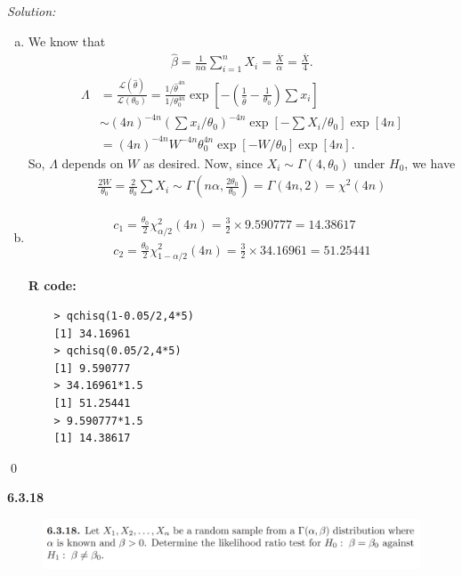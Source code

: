 \documentclass{book}
\theoremstyle{definition}
\newcommand{\lag}{\mathcal{L}}
\newcommand{\nn}{\nonumber}
\newcommand{\al}{\alpha}
\newcommand{\f}[2]{\frac{#1}{#2}}
\newcommand{\lp}{\left(}
\newcommand{\rp}{\right)}
\newcommand{\lb}{\left[}
\newcommand{\rb}{\right]}
\begin{document}
\noindent \textit{Solution:} 
\begin{enumerate}[(a)]
	\item 
	We know that
	\begin{align}
	\hat\beta = \f{1}{n\al} \sum^n_{i=1}X_i = \f{\bar{X}}{\al} = \f{\bar{X}}{4}.
	\end{align}
	\begin{align}
	\Lambda &= \f{\lag(\hat\theta)}{\lag (\theta_0)} = \f{1/\hat\theta^{4n}}{1/\theta_0^{4n}} \exp \lb -\lp  \f{1}{\hat\theta}- \f{1}{\theta_0} \rp\sum x_i  \rb\nn\\
	&\sim (4 n)^{-4n}\lp\sum x_i/\theta_0\rp^{-4n} \exp \lb -\sum X_i/\theta_0 \rb \exp\lb 4n \rb\nn\\
	&= (4 n)^{-4n}W^{-4n}\theta_0^{4n} \exp \lb -W/\theta_0 \rb \exp\lb 4n \rb.
	\end{align}
	So, $\Lambda$ depends on $W$ as desired. Now, since $X_i \sim \Gamma(4,\theta_0)$ under $H_0$, we have
	\begin{align}
	\f{2W}{\theta_0} = \f{2}{\theta_0}\sum X_i \sim \Gamma\lp n\al, \f{2\theta_0}{\theta_0} \rp = \Gamma(4n,2) = \boxed{\chi^2(4n)}
	\end{align} 
	
	
	\item 
	\begin{align}
	c_1 = \f{\theta_0}{2}\chi^2_{\al/2}(4n) = \f{3}{2}\times 9.590777 = \boxed{14.38617}\nn\\
	c_2 = \f{\theta_0}{2}\chi^2_{1-\al/2}(4n) = \f{3}{2}\times 34.16961 = \boxed{51.25441}
	\end{align}
	
	
	\textbf{R code:}
	\begin{lstlisting}
	> qchisq(1-0.05/2,4*5)
	[1] 34.16961
	> qchisq(0.05/2,4*5)
	[1] 9.590777
	> 34.16961*1.5
	[1] 51.25441
	> 9.590777*1.5
	[1] 14.38617 
	\end{lstlisting}
\end{enumerate}\qed










\newpage
\noindent \textbf{6.3.18}
\begin{figure}[!htb]
	\centering
	\includegraphics[scale=0.6]{6318}
\end{figure}
\end{document}
